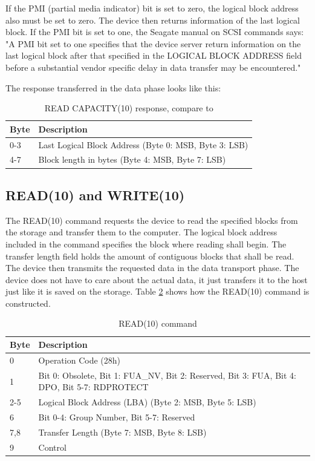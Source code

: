 If the PMI (partial media indicator) bit is set to zero, the logical block address also must be set to zero. The device then returns information of the last logical block. If the PMI bit is set to one, the Seagate manual on SCSI commands says: "A PMI bit set to one specifies that the device server return information on the last logical block after that specified in the LOGICAL BLOCK ADDRESS field before a substantial vendor specific delay in data transfer may be encountered."\cite{scsi_seagate}

The response transferred in the data phase looks like this:

\begin{table}[ht]
\caption{READ CAPACITY(10) response, compare to \cite{usb_ms_jan, scsi_seagate}}
\centering
\begin{tabular}{|l|l|}
\hline\hline
\textbf{Byte} & \textbf{Description}\\ \hline
0-3 & Last Logical Block Address (Byte 0: MSB, Byte 3: LSB)\\ \hline
4-7 & Block length in bytes (Byte 4: MSB, Byte 7: LSB) \\ \hline
\end{tabular}
\label{table:read_capacity_response}
\end{table}

\subsection{READ(10) and WRITE(10)}

The READ(10) command requests the device to read the specified blocks from the storage and transfer them to the computer. The logical block address included in the command specifies the block where reading shall begin. The transfer length field holds the amount of contiguous blocks that shall be read. The device then transmits the requested data in the data transport phase. The device does not have to care about the actual data, it just transfers it to the host just like it is saved on the storage. Table \ref{table:read_10} shows how the READ(10) command is constructed.

\begin{table}[ht]
\caption{READ(10) command\cite{scsi_seagate}}
\centering
\begin{tabular}{|l|p{10cm}|}
\hline\hline
\textbf{Byte} & \textbf{Description}\\ \hline
0 & Operation Code (28h)\\ \hline
1 & Bit 0: Obsolete, Bit 1: FUA\_NV, Bit 2: Reserved, Bit 3: FUA, Bit 4: DPO, Bit 5-7: RDPROTECT \\ \hline
2-5 & Logical Block Address (LBA) (Byte 2: MSB, Byte 5: LSB) \\ \hline
6 & Bit 0-4: Group Number, Bit 5-7: Reserved \\ \hline
7,8 & Transfer Length (Byte 7: MSB, Byte 8: LSB) \\ \hline
9 & Control \\ \hline
\end{tabular}
\label{table:read_10}
\end{table}

